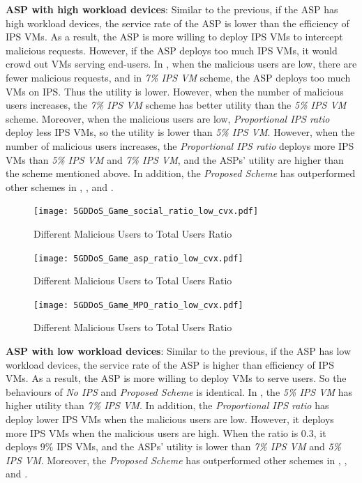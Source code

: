 \documentclass[conference]{IEEEtran}
\begin{document}
\textbf{ASP with high workload devices}: Similar to the previous, if the ASP has high workload devices, the service rate of the ASP is lower than the efficiency of IPS VMs. As a result, the ASP is more willing to deploy IPS VMs to intercept malicious requests. However, if the ASP deploys too much IPS VMs, it would crowd out VMs serving end-users. In , when the malicious users are low, there are fewer malicious requests, and in \textit{7\% IPS VM} scheme, the ASP deploys too much VMs on IPS. Thus the utility is lower. However, when the number of malicious users increases, the \textit{7\% IPS VM} scheme has better utility than the \textit{5\% IPS VM} scheme. Moreover, when the malicious users are low, \textit{Proportional IPS ratio} deploy less IPS VMs, so the utility is lower than \textit{5\% IPS VM}. However, when the number of malicious users increases, the \textit{Proportional IPS ratio} deploys more IPS VMs than \textit{5\% IPS VM} and \textit{7\% IPS VM}, and the ASPs' utility are higher than the scheme mentioned above. In addition, the \textit{Proposed Scheme} has outperformed other schemes in , , and .

\begin{figure}[!ht]
  \texttt{[image: 5GDDoS\_Game\_social\_ratio\_low\_cvx.pdf]}
    \caption{Different Malicious Users to Total Users Ratio}
\label{fig:ratio_soc_low}
\end{figure}

\begin{figure}[!ht]
  \texttt{[image: 5GDDoS\_Game\_asp\_ratio\_low\_cvx.pdf]}
    \caption{Different Malicious Users to Total Users Ratio}
\label{fig:ratio_asp_low}
\end{figure}

\begin{figure}[!ht]
  \texttt{[image: 5GDDoS\_Game\_MPO\_ratio\_low\_cvx.pdf]}
    \caption{Different Malicious Users to Total Users Ratio}
\label{fig:ratio_mpo_low}
\end{figure}

\textbf{ASP with low workload devices}: Similar to the previous, if the ASP has low workload devices, the service rate of the ASP is higher than efficiency of IPS VMs. As a result, the ASP is more willing to deploy VMs to serve users. So the behaviours of \textit{No IPS} and \textit{Proposed Scheme} is identical. In , the \textit{5\% IPS VM} has higher utility than \textit{7\% IPS VM}. In addition, the \textit{Proportional IPS ratio} has deploy lower IPS VMs when the malicious users are low. However, it deploys more IPS VMs when the malicious users are high. When the ratio is $0.3$, it deploys $9\%$ IPS VMs, and the ASPs' utility is lower than \textit{7\% IPS VM} and \textit{5\% IPS VM}. Moreover, the \textit{Proposed Scheme} has outperformed other schemes in , , and .
\end{document}
